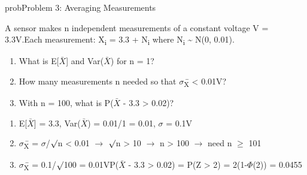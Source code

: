 \begin{PSbox}[unbreakable]{prob}{Problem 3: Averaging Measurements}

A sensor makes n independent measurements of a constant voltage V = 3.3V.\PSbr{}Each measurement: X\textsubscript{i} = 3.3 + N\textsubscript{i} where N\textsubscript{i} \textasciitilde{} N(0, 0.01).

\begin{enumerate}
\def\labelenumi{(\alph{enumi})}
\tightlist
\item
  What is E[\ensuremath{\bar{X}}] and Var(\ensuremath{\bar{X}}) for n = 1?
\item
  How many measurements n needed so that \ensuremath{\sigma}\textsubscript{X}̄ \textless{} 0.01V?
\item
  With n = 100, what is P(\textbar{}\ensuremath{\bar{X}} - 3.3\textbar{} \textgreater{} 0.02)?
\end{enumerate}

\PSsolution{} 

\begin{enumerate}
\def\labelenumi{(\alph{enumi})}
\item
  E[\ensuremath{\bar{X}}] = 3.3, Var(\ensuremath{\bar{X}}) = 0.01/1 = 0.01, \ensuremath{\sigma} = 0.1V
\item
  \ensuremath{\sigma}\textsubscript{X}̄ = \ensuremath{\sigma}/\ensuremath{\surd}n \textless{} 0.01 \ensuremath{\to} \ensuremath{\surd}n \textgreater{} 10 \ensuremath{\to} n \textgreater{} 100 \ensuremath{\to} need n \ensuremath{\ge} 101
\item
  \ensuremath{\sigma}\textsubscript{X}̄ = 0.1/\ensuremath{\surd}100 = 0.01V\PSbr{}P(\textbar{}\ensuremath{\bar{X}} - 3.3\textbar{} \textgreater{} 0.02) = P(\textbar{}Z\textbar{} \textgreater{} 2) = 2(1-\ensuremath{\Phi}(2)) = 0.0455
\end{enumerate}

\end{PSbox}

